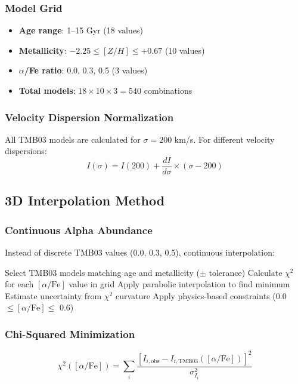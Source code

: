 \documentclass[12pt,a4paper]{article}
\newcommand{\alphaFe}{[\alpha/\text{Fe}]}
\begin{document}
\subsubsection{Model Grid}
\begin{itemize}
    \item \textbf{Age range}: 1--15 Gyr (18 values)
    \item \textbf{Metallicity}: $-2.25 \leq [Z/H] \leq +0.67$ (10 values)  
    \item \textbf{$\alpha$/Fe ratio}: 0.0, 0.3, 0.5 (3 values)
    \item \textbf{Total models}: $18 \times 10 \times 3 = 540$ combinations
\end{itemize}

\subsubsection{Velocity Dispersion Normalization}
All TMB03 models are calculated for $\sigma = 200$ km/s. For different velocity dispersions:
\begin{equation}
I(\sigma) = I(200) + \frac{dI}{d\sigma} \times (\sigma - 200)
\end{equation}

\subsection{3D Interpolation Method}

\subsubsection{Continuous Alpha Abundance}
Instead of discrete TMB03 values (0.0, 0.3, 0.5), continuous interpolation:
\begin{algorithm}
\caption{Continuous $\alphaFe$ Calculation}
\begin{algorithmic}[1]
\STATE Select TMB03 models matching age and metallicity ($\pm$ tolerance)
\STATE Calculate $\chi^2$ for each $\alphaFe$ value in grid
\STATE Apply parabolic interpolation to find minimum
\STATE Estimate uncertainty from $\chi^2$ curvature
\STATE Apply physics-based constraints (0.0 $\leq \alphaFe \leq$ 0.6)
\end{algorithmic}
\end{algorithm}

\subsubsection{Chi-Squared Minimization}
\begin{equation}
\chi^2(\alphaFe) = \sum_{i} \frac{[I_{i,\text{obs}} - I_{i,\text{TMB03}}(\alphaFe)]^2}{\sigma_{I_i}^2}
\end{equation}
\end{document}

